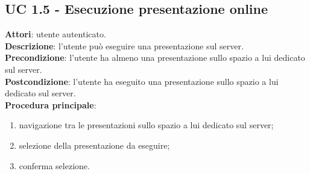 \subsection{UC 1.5 - Esecuzione presentazione online}{
	\label{uc1.5}
	\textbf{Attori}: utente autenticato.\\
	\textbf{Descrizione}: l'utente può eseguire una presentazione sul server.\\
	\textbf{Precondizione}: l'utente ha almeno una presentazione sullo spazio a lui dedicato sul server.\\
	\textbf{Postcondizione}: l'utente ha eseguito una presentazione sullo spazio a lui dedicato sul server.\\
	\textbf{Procedura principale}:
	\begin{enumerate}
		\item navigazione tra le presentazioni sullo spazio a lui dedicato sul server;
		\item selezione della presentazione da eseguire;
		\item conferma selezione.
	\end{enumerate}
}